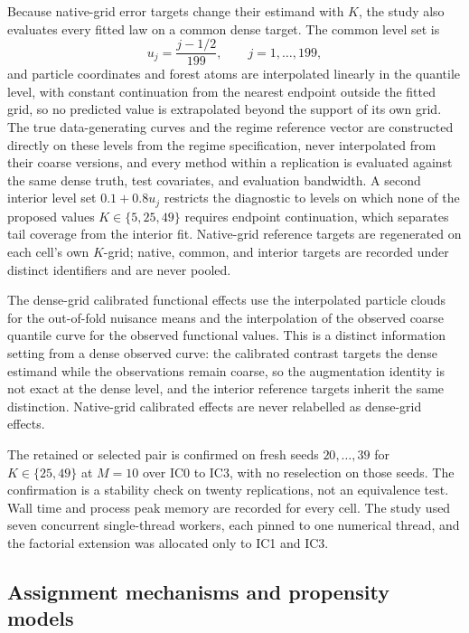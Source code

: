Because native-grid error targets change their estimand with $K$, the study also evaluates every fitted law on a common dense target. The common level set is
\begin{equation}\label{eq:sens-common-grid}
u_j=\frac{j-1/2}{199},\qquad j=1,\ldots,199,
\end{equation}
and particle coordinates and forest atoms are interpolated linearly in the quantile level, with constant continuation from the nearest endpoint outside the fitted grid, so no predicted value is extrapolated beyond the support of its own grid. The true data-generating curves and the regime reference vector are constructed directly on these levels from the regime specification, never interpolated from their coarse versions, and every method within a replication is evaluated against the same dense truth, test covariates, and evaluation bandwidth. A second interior level set $0.1+0.8u_j$ restricts the diagnostic to levels on which none of the proposed values $K\in\{5,25,49\}$ requires endpoint continuation, which separates tail coverage from the interior fit. Native-grid reference targets are regenerated on each cell's own $K$-grid; native, common, and interior targets are recorded under distinct identifiers and are never pooled.

The dense-grid calibrated functional effects use the interpolated particle clouds for the out-of-fold nuisance means and the interpolation of the observed coarse quantile curve for the observed functional values. This is a distinct information setting from a dense observed curve: the calibrated contrast targets the dense estimand while the observations remain coarse, so the augmentation identity is not exact at the dense level, and the interior reference targets inherit the same distinction. Native-grid calibrated effects are never relabelled as dense-grid effects.

The retained or selected pair is confirmed on fresh seeds $20,\ldots,39$ for $K\in\{25,49\}$ at $M=10$ over IC0 to IC3, with no reselection on those seeds. The confirmation is a stability check on twenty replications, not an equivalence test. Wall time and process peak memory are recorded for every cell. The study used seven concurrent single-thread workers, each pinned to one numerical thread, and the factorial extension was allocated only to IC1 and IC3.

\subsection{Assignment mechanisms and propensity models}\label{sec:assignment-design}

